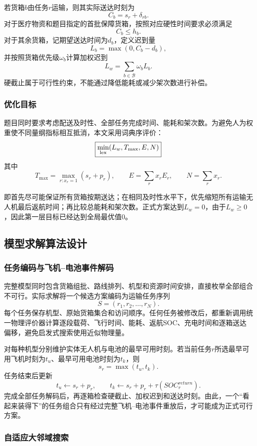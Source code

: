 \documentclass[UTF8,a4paper,12pt]{ctexart}
\begin{document}
若货箱$b$由任务$r$运输，则其实际送达时刻为
\[
C_b=s_r+\delta_{rb}.
\]
对于医疗物资和题目指定的首批保障货箱，按照对应硬性时间要求必须满足
\[
C_b\le h_b.
\]
对于其余货箱，记期望送达时间为$d_b$，定义迟到量
\[
L_b=\max(0,C_b-d_b),
\]
并按照货箱优先级$\omega_b$计算加权迟到
\[
L_w=\sum_{b\in\mathcal B}\omega_bL_b.
\]
硬截止属于可行性约束，不能通过降低能耗或减少架次数进行补偿。

\subsubsection{优化目标}

题目同时要求考虑配送及时性、全部任务完成时间、能耗和架次数。为避免人为权重使不同量纲指标相互抵消，本文采用词典序评价：
\[
\boxed{
\min_{\rm lex}(L_w,T_{\max},E,N)
}
\]
其中
\[
T_{\max}=\max_{r:x_r=1}(s_r+p_r),
\qquad
E=\sum_rx_rE_r,
\qquad
N=\sum_rx_r.
\]

即首先尽可能保证所有货箱按期送达；在相同及时性水平下，优先缩短所有运输无人机最后返航时间；再比较总能耗和架次数。正式方案达到$L_w=0$，由于$L_w\ge0$，因此第一层目标已经达到全局最优值0。

\subsection{模型求解算法设计}

\subsubsection{任务编码与飞机--电池事件解码}

完整模型同时包含货箱组批、路线排列、机型和资源时间安排，直接枚举全部组合不可行。实际求解将一个候选方案编码为运输任务序列
\[
S=(r_1,r_2,\ldots,r_N).
\]
每个任务保存机型、原始货箱集合和访问顺序。任何任务被修改后，都重新调用统一物理评价器计算逐段载荷、飞行时间、能耗、返航SOC、充电时间和逐箱送达偏移，避免启发式搜索使用近似物理量。

对每种机型分别维护实体无人机与电池的最早可用时刻。若当前任务$r$所选最早可用飞机时刻为$t_u$、最早可用电池时刻为$t_k$，则
\[
\boxed{
s_r=\max(t_u,t_k).
}
\]
任务结束后更新
\[
t_u\leftarrow s_r+p_r,
\qquad
t_k\leftarrow s_r+p_r+\tau(SOC_r^{return}).
\]
完成全部任务解码后，再逐箱检查硬截止、加权迟到和送达时刻。由此，一个“看起来装得下”的任务组合只有经过完整飞机--电池事件重放后，才可能成为正式可行方案。

\subsubsection{自适应大邻域搜索}
\end{document}
